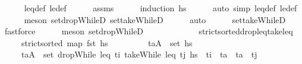 \begin{isabellebody}
%
\isadelimproof
\ \ \ \ %
\endisadelimproof
%
\isatagproof
{}\isamarkupfalse%
\ leq{\isacharunderscore}{\kern0pt}def\ le{\isacharunderscore}{\kern0pt}def\isanewline
\ \ \ \ \isamarkupfalse%
\ assms\isanewline
\ \ \ \ \isamarkupfalse%
\ {\isacharparenleft}{\kern0pt}induction\ hs{\isacharparenright}{\kern0pt}\isanewline
\ \ \ \ \isamarkupfalse%
\ {\isacharparenleft}{\kern0pt}auto\ simp{\isacharcolon}{\kern0pt}\ leq{\isacharunderscore}{\kern0pt}def\ le{\isacharunderscore}{\kern0pt}def{\isacharparenright}{\kern0pt}\isanewline
\ \ \ \ \isamarkupfalse%
\ {\isacharparenleft}{\kern0pt}meson\ set{\isacharunderscore}{\kern0pt}dropWhileD\ set{\isacharunderscore}{\kern0pt}takeWhileD{\isacharparenright}{\kern0pt}\isanewline
\ \ \ \ \isamarkupfalse%
\ auto{\isacharbrackleft}{\kern0pt}{}{\isacharbrackright}{\kern0pt}\isanewline
\ \ \ \ \isamarkupfalse%
\ set{\isacharunderscore}{\kern0pt}takeWhileD\ \isamarkupfalse%
\ fastforce\isanewline
\ \ \ \ \isamarkupfalse%
\ {\isacharparenleft}{\kern0pt}meson\ set{\isacharunderscore}{\kern0pt}dropWhileD{\isacharparenright}{\kern0pt}{\isacharplus}{\kern0pt}\isanewline
\ \ \ \ \isamarkupfalse%
%
\endisatagproof
{\isafoldproof}%
%
\isadelimproof
%
\endisadelimproof
\ \isanewline
\ \ \isanewline
\ \ \isamarkupfalse%
\ strict{\isacharunderscore}{\kern0pt}sorted{\isacharunderscore}{\kern0pt}drop{\isacharunderscore}{\kern0pt}leq{\isacharunderscore}{\kern0pt}take{\isacharunderscore}{\kern0pt}leq{\isacharcolon}{\kern0pt}\isanewline
\ \ \ \ \ {\isachardoublequoteopen}strict{\isacharunderscore}{\kern0pt}sorted\ {\isacharparenleft}{\kern0pt}map\ fst\ hs{\isacharparenright}{\kern0pt}{\isachardoublequoteclose}\isanewline
\ \ \ \ \ \ \ \ \ {\isachardoublequoteopen}{\isacharparenleft}{\kern0pt}t\isactrlsub a{\isacharcomma}{\kern0pt}A{\isacharparenright}{\kern0pt}\ {\isasymin}\ set\ hs{\isachardoublequoteclose}\isanewline
\ \ \ \ \ {\isachardoublequoteopen}{\isacharparenleft}{\kern0pt}t\isactrlsub a{\isacharcomma}{\kern0pt}A{\isacharparenright}{\kern0pt}\ {\isasymin}\ set\ {\isacharparenleft}{\kern0pt}dropWhile\ {\isacharparenleft}{\kern0pt}leq\ t\isactrlsub i{\isacharparenright}{\kern0pt}\ {\isacharparenleft}{\kern0pt}takeWhile\ {\isacharparenleft}{\kern0pt}leq\ t\isactrlsub j{\isacharparenright}{\kern0pt}\ hs{\isacharparenright}{\kern0pt}{\isacharparenright}{\kern0pt}\ {\isasymlongleftrightarrow}\ t\isactrlsub i\ {\isacharless}{\kern0pt}\ t\isactrlsub a\ {\isasymand}\ t\isactrlsub a\ {\isasymle}\ t\isactrlsub j{\isachardoublequoteclose}\isanewline

\end{isabellebody}
